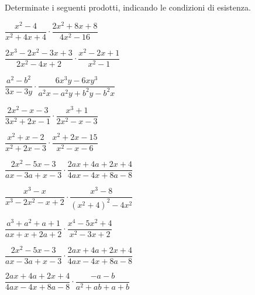 \begin{esercizio}
\label{ese:19.16}
Determinate i seguenti prodotti, indicando le condizioni di esistenza.
\begin{multicols}{2}
\begin{enumeratea}
 \item $\dfrac{x^{2}-4}{x^{2}+4x+4}\cdot \dfrac{2x^{2}+8x+8}{4x^{2}-16}$
 \item $\dfrac{2x^{3}-2x^{2}-3x+3}{2x^{2}-4x+2}\cdot{\dfrac{x^{2}-2x+1}{x^{2}-1}}$
 \item $\dfrac{a^{2}-b^{2}}{3x-3y}\cdot {\dfrac{6x^{3}y-6xy^{3}}{a^{2}x-a^{2}y+b^{2}y-b^{2}x}}$
 \item $\dfrac{2x^{2}-x-3}{3x^{2}+2x-1}\cdot {\dfrac{x^{3}+1}{2x^{2}-x-3}}$
 \item $\dfrac{x^{2}+x-2}{x^{2}+2x-3}\cdot {\dfrac{x^{2}+2x-15}{x^{2}-x-6}}$
 \item $\dfrac{2x^{2}-5x-3}{ax-3a+x-3}\cdot {\dfrac{2ax+4a+2x+4}{4ax-4x+8a-8}}$
 \item $\dfrac{x^{3}-x}{x^{3}-2x^{2}-x+2}\cdot {\dfrac{x^{3}-8}{\left(x^{2}+4\right)^{2}-4x^{2}}}$
 \item $\dfrac{a^{3}+a^{2}+a+1}{ax+x+2a+2}\cdot {\dfrac{x^{4}-5x^{2}+4}{x^{2}-3x+2}}$
 \item $\dfrac{2x^{2}-5x-3}{ax-3a+x-3}\cdot {\dfrac{2ax+4a+2x+4}{4ax-4x+8a-8}}$
 \item $\dfrac{2ax+4a+2x+4}{4ax-4x+8a-8}\cdot {\dfrac{-a-b}{a^{2}+ab+a+b}}$
\end{enumeratea}
\end{multicols}
\end{esercizio}

\subsubsection*{}

